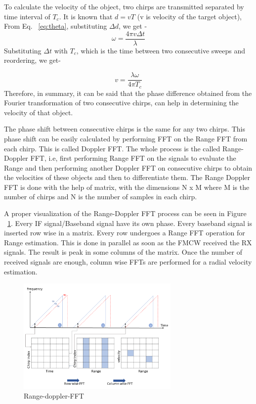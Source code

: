 To calculate the velocity of the object, two chirps are transmitted separated by time interval of $T_{c}$.
It is known that $d= vT$ (v is velocity of the target object), From Eq. ~\ref{eq:theta}, substituting $\Delta d$, we get -
\begin{equation}
    \omega= \frac{4\pi v \Delta t}{\lambda}
\end{equation}
Substituting $\Delta t$ with $T_{c}$, which is the time between two consecutive sweeps and reordering, we get-

\begin{equation}
    v= \frac{\lambda \omega}{4\pi T_{c}}
\end{equation}
Therefore, in summary, it can be said that the phase difference obtained from the Fourier transformation of two consecutive chirps, can help in determining the velocity of that object. 

The phase shift between consecutive chirps is the same for any two chirps. This phase shift can be easily calculated by performing FFT on the Range FFT from each chirp. This is called Doppler FFT. The whole process is the called Range-Doppler FFT, i.e, first performing Range FFT on the signals to evaluate the Range and then performing another Doppler FFT on consecutive chirps to obtain the velocities of these objects and then to differentiate them. 
The Range Doppler FFT is done with the help of matrix, with the dimensions N x M where M is the number of chirps and N is the number of samples in each chirp.

A proper visualization of the Range-Doppler FFT process can be seen in Figure ~\ref{fig:range-doppler-FFT}. Every IF signal/Baseband signal have its own phase. Every baseband signal is inserted row wise in a matrix. Every row undergoes a Range FFT operation for Range estimation. This is done in parallel as soon as the FMCW received the RX signals. The result is peak in some columns of the matrix. Once the number of received signals are enough, column wise FFTs are performed for a radial velocity estimation.
 \begin{figure}[ht]
  \begin{center}
    \includegraphics[width=0.7\textwidth]{Master's thesis/images/range_doppler1.png}
    \caption{Range-doppler-FFT}
    \label{fig:range-doppler-FFT}
  \end{center}
\end{figure}  



